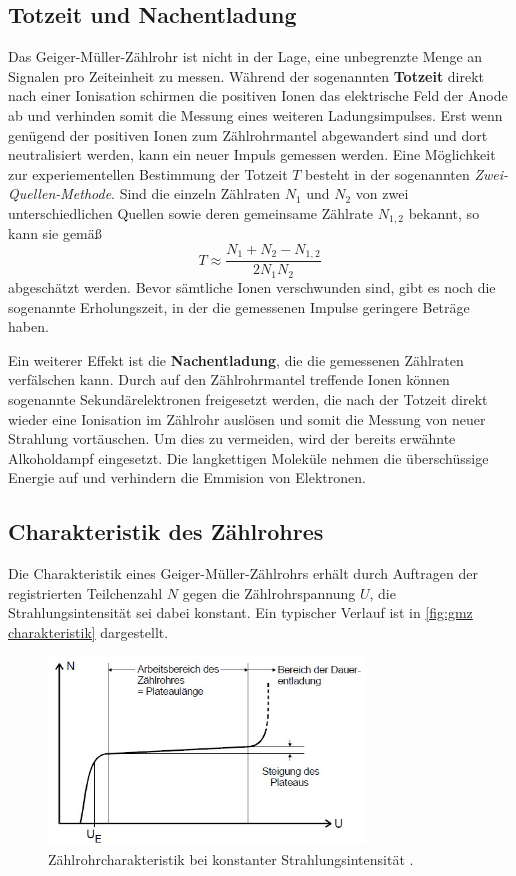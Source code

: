 \subsection{Totzeit und Nachentladung}
\label{sec:Totzeit}
Das Geiger-Müller-Zählrohr ist nicht in der Lage, eine unbegrenzte Menge an Signalen pro Zeiteinheit zu messen.
Während der sogenannten \textbf{Totzeit} direkt nach einer Ionisation schirmen die positiven Ionen das elektrische Feld der Anode ab
und verhinden somit die Messung eines weiteren Ladungsimpulses.
Erst wenn genügend der positiven Ionen zum Zählrohrmantel abgewandert sind und dort neutralisiert werden, kann ein neuer Impuls gemessen werden.
Eine Möglichkeit zur experiementellen Bestimmung der Totzeit $T$ besteht in der sogenannten \textit{Zwei-Quellen-Methode}.
Sind die einzeln Zählraten $N_1$ und $N_2$ von zwei unterschiedlichen Quellen sowie deren gemeinsame
Zählrate $N_{1,2}$ bekannt, so kann sie gemäß
\begin{equation}
    \label{eq:2 Quellen}
    T \approx \frac{N_1 + N_2 - N_{1,2}}{2N_1 N_2}
\end{equation}
abgeschätzt werden.
Bevor sämtliche Ionen verschwunden sind, gibt es noch die sogenannte Erholungszeit, in der die gemessenen Impulse
geringere Beträge haben.

Ein weiterer Effekt ist die \textbf{Nachentladung}, die die gemessenen Zählraten verfälschen kann.
Durch auf den Zählrohrmantel treffende Ionen können sogenannte Sekundärelektronen freigesetzt werden, die
nach der Totzeit direkt wieder eine Ionisation im Zählrohr auslösen und somit die Messung von neuer Strahlung vortäuschen.
Um dies zu vermeiden, wird der bereits erwähnte Alkoholdampf eingesetzt. Die langkettigen Moleküle nehmen
die überschüssige Energie auf und verhindern die Emmision von Elektronen.

\subsection{Charakteristik des Zählrohres}
Die Charakteristik eines Geiger-Müller-Zählrohrs erhält durch Auftragen der registrierten Teilchenzahl $N$
gegen die Zählrohrspannung $U$, die Strahlungsintensität sei dabei konstant. Ein typischer Verlauf ist
in \autoref{fig:gmz charakteristik} dargestellt.

\begin{figure}[H]
    \centering
    \includegraphics[height=5cm]{content/pics/charakteristik.jpg}
    \caption{Zählrohrcharakteristik bei konstanter Strahlungsintensität \cite{v703}.}
    \label{fig:gmz charakteristik}
\end{figure}

